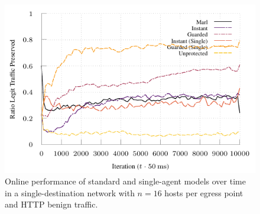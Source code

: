 \documentclass[10pt, times, conference, letterpaper]{IEEEtran}
\begin{document}
\begin{figure}
	\centering
	\includegraphics[width=0.9\linewidth]{../plots/tnsm-tcp-16-single}
	
	\caption{
		Online performance of standard and single-agent models over time in a single-destination network with $n=16$ hosts per egress point and HTTP benign traffic.
		\vspace{-1em}
		\label{fig:tcp-tree-16}
	}
\end{figure}

%	

%	
\end{document}
